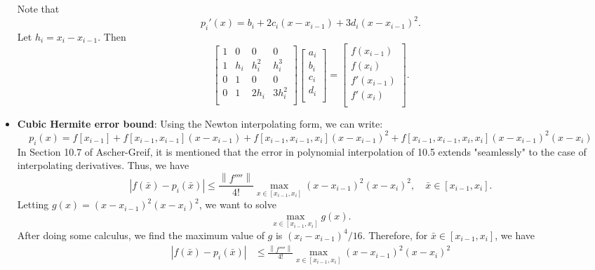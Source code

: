 \documentclass{report}
\begin{document}
\begin{itemize}
            \bigbreak \noindent 
            Note that
            $$p_i'(x) = b_i + 2c_i(x-x_{i-1}) + 3d_i(x-x_{i-1})^2.$$
            Let $h_i = x_i - x_{i-1}$. Then
            $$
            \begin{bmatrix}
                1&0&0&0\\
                1&h_i&h_i^2&h_i^3\\
                0&1&0&0\\
                0&1&2h_i&3h_i^2\\
            \end{bmatrix}
            \begin{bmatrix}
                a_i\\b_i\\c_i\\d_i\\
            \end{bmatrix}
            =
            \begin{bmatrix}
                f(x_{i-1})\\f(x_{i})\\f'(x_{i-1})\\f'(x_{i})\\
            \end{bmatrix}.
            $$
        \item \textbf{Cubic Hermite error bound}:
            Using the Newton interpolating form, we can write:
            $$p_i(x) = f[x_{i-1}] + f[x_{i-1},x_{i-1}](x-x_{i-1}) + f[x_{i-1},x_{i-1},x_i](x-x_{i-1})^2 + f[x_{i-1},x_{i-1},x_i,x_i](x-x_{i-1})^2(x-x_i)$$
            In Section 10.7 of Ascher-Greif, it is mentioned that the error in polynomial interpolation of 10.5 extends "seamlessly" to the case of interpolating derivatives. Thus, we have
            $$\left|f(\bar x) - p_i(\bar x)\right| \leq \frac{\left\|f''''\right\|}{4!} \max_{x \in [x_{i-1},x_i]} (x-x_{i-1})^2(x-x_i)^2, \quad \bar x \in [x_{i-1},x_i].$$
            \bigbreak \noindent 
            Letting $g(x) = (x-x_{i-1})^2(x-x_i)^2$, we want to solve
            $$\max_{x \in [x_{i-1},x_i]} g(x).$$
            \bigbreak \noindent 
            After doing some calculus, we find the maximum value of $g$ is $(x_{i}-x_{i-1})^4/16$.
            \bigbreak \noindent 
            Therefore, for $\bar x \in [x_{i-1},x_i]$, we have
            \begin{align*}
                \left|f(\bar x) - p_i(\bar x)\right| 
&\leq \frac{\left\|f''''\right\|}{4!} \max_{x \in [x_{i-1},x_i]} (x-x_{i-1})^2(x-x_i)^2\\

\end{align*}
\end{itemize}
\end{document}
